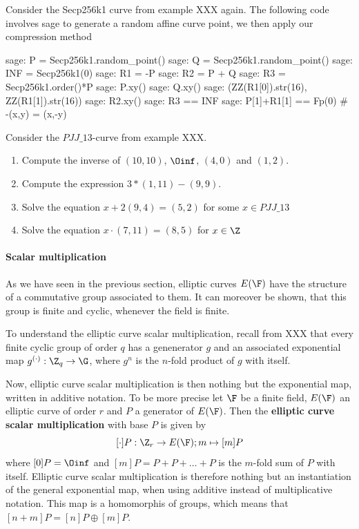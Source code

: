 \begin{example}
Consider the Secp256k1 curve from example XXX again. The following code involves sage to generate a random affine curve point, we then apply our compression method   
\begin{sagecommandline}
sage: P = Secp256k1.random_point()
sage: Q = Secp256k1.random_point()
sage: INF = Secp256k1(0)
sage: R1 = -P
sage: R2 = P + Q
sage: R3 = Secp256k1.order()*P
sage: P.xy()
sage: Q.xy()
sage: (ZZ(R1[0]).str(16), ZZ(R1[1]).str(16))
sage: R2.xy()
sage: R3 == INF
sage: P[1]+R1[1] == Fp(0) # -(x,y) = (x,-y)
\end{sagecommandline}
\end{example}
\begin{exercise}
Consider the $\mathit{PJJ\_13}$-curve from example XXX. 
\begin{enumerate}
\item Compute the inverse of $(10,10)$, $\Oinf$, $(4,0)$ and $(1,2)$.
\item Compute the expression $3*(1,11) - (9,9)$.
\item Solve the equation $x + 2(9,4) = (5,2) $ for some $x\in \mathit{PJJ\_13}$
\item Solve the equation $x\cdot (7,11) = (8,5)$ for $x\in \Z$
\end{enumerate}
\end{exercise}
\paragraph{Scalar multiplication}
As we have seen in the previous section, elliptic curves $E(\F)$ have the structure of a commutative group associated to them. It can moreover be shown, that this group is finite and cyclic, whenever the field is finite. 

To understand the elliptic curve scalar multiplication, recall from XXX that every finite cyclic group of order $q$ has a genenerator $g$ and an associated exponential map $g^{(\cdot)}: \Z_q \to \G$, where $g^n$ is the $n$-fold product of $g$ with itself.  

Now, elliptic curve scalar multiplication is then nothing but the exponential map, written in additive notation. To be more precise let $\F$ be a finite field, $E(\F)$ an elliptic curve of order $r$ and $P$ a generator of $E(\F)$. Then the \textbf{elliptic curve scalar multiplication} with base $P$ is given by
$$
[\cdot]P: \Z_r \to E(\F); m \mapsto [m]P
$$
where $[0]P = \Oinf$ and $[m]P = P+P+\ldots + P$ is the $m$-fold sum of $P$ with itself. Elliptic curve scalar multiplication is therefore nothing but an instantiation of the general exponential map, when using additive instead of multiplicative notation. This map is a homomorphis of groups, which means that $[n+m]P = [n]P \oplus [m]P$. 

